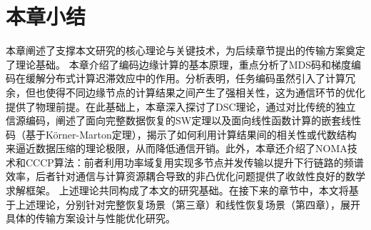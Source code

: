 %
%




\section{本章小结}

本章阐述了支撑本文研究的核心理论与关键技术，为后续章节提出的传输方案奠定了理论基础。
本章介绍了编码边缘计算的基本原理，重点分析了MDS码和梯度编码在缓解分布式计算迟滞效应中的作用。分析表明，任务编码虽然引入了计算冗余，但也使得不同边缘节点的计算结果之间产生了强相关性，这为通信环节的优化提供了物理前提。在此基础上，本章深入探讨了DSC理论，通过对比传统的独立信源编码，阐述了面向完整数据恢复的SW定理以及面向线性函数计算的嵌套线性码（基于Körner-Marton定理），揭示了如何利用计算结果间的相关性或代数结构来逼近数据压缩的理论极限，从而降低通信开销。此外，本章还介绍了NOMA技术和CCCP算法：前者利用功率域复用实现多节点并发传输以提升下行链路的频谱效率，后者针对通信与计算资源耦合导致的非凸优化问题提供了收敛性良好的数学求解框架。
上述理论共同构成了本文的研究基础。在接下来的章节中，本文将基于上述理论，分别针对完整恢复场景（第三章）和线性恢复场景（第四章），展开具体的传输方案设计与性能优化研究。
